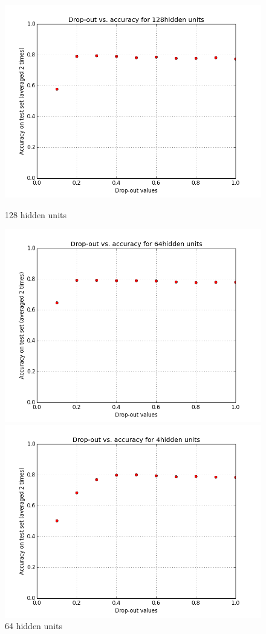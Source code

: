 \documentclass[a4paper,12pt]{article}
\begin{document}
\begin{figure}[!htb]
	\includegraphics[width=\linewidth]{dropout_plot_128.png}
	\caption{128 hidden units}\label{fig:awesome_image1}
	\endminipage\hfill
	\includegraphics[width=\linewidth]{dropout_plot_64.png}
	\caption{64 hidden units}\label{fig:awesome_image2}
	\endminipage\hfill
	\includegraphics[width=\linewidth]{dropout_plot_4.png}

\end{figure}
\end{document}

